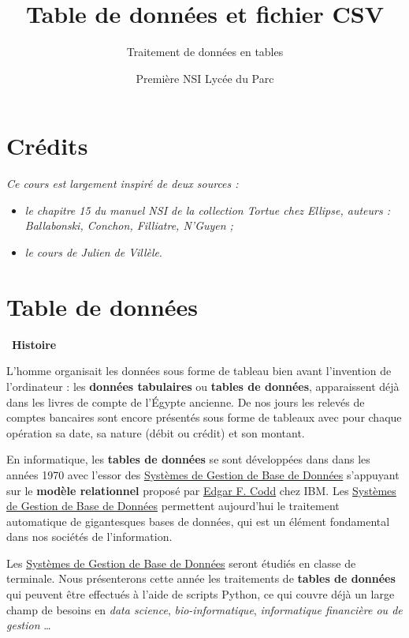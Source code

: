 \documentclass[
  11pt,
]{article}
\title{Table de données et fichier CSV}
\subtitle{Traitement de données en tables}
\author{Première NSI Lycée du Parc}
\date{}
\providecommand{\tightlist}{%
  \setlength{\itemsep}{0pt}\setlength{\parskip}{0pt}}
\newcounter{prop}
\newcounter{cours}
\newcounter{histo}
\newenvironment{histoire}[1]
{\par \medskip   \addtocounter{histo}{1} \noindent  
 \begin {bclogo}[couleur = blue!10 , arrondi =0.1,logo=\bchorloge, marge=4] {~\textbf{Histoire} \textbf{\thehisto} {\itshape #1} }  \par}
{
\end{bclogo}
 \par \bigskip }
\begin{document}
\maketitle

\renewcommand*\contentsname{Table des matières}
{
\hypersetup{linkcolor=}
\setcounter{tocdepth}{3}
\tableofcontents
}
\hypertarget{cruxe9dits}{%
\section*{Crédits}\label{cruxe9dits}}

\emph{Ce cours est largement inspiré de deux sources :}

\begin{itemize}
\tightlist
\item
  \emph{le chapitre 15 du manuel NSI de la collection Tortue chez
  Ellipse, auteurs : Ballabonski, Conchon, Filliatre, N'Guyen ;}
\item
  \emph{le cours de Julien de Villèle}.
\end{itemize}

\hypertarget{table-de-donnuxe9es}{%
\section{Table de données}\label{table-de-donnuxe9es}}

\begin{histoire}{}

L'homme organisait les données sous forme de tableau bien avant
l'invention de l'ordinateur : les \textbf{données tabulaires} ou
\textbf{tables de données}, apparaissent déjà dans les livres de compte
de l'Égypte ancienne. De nos jours les relevés de comptes bancaires sont
encore présentés sous forme de tableaux avec pour chaque opération sa
date, sa nature (débit ou crédit) et son montant.

En informatique, les \textbf{tables de données} se sont développées dans
dans les années 1970 avec l'essor des
\href{https://fr.wikipedia.org/wiki/Syst\%C3\%A8me_de_gestion_de_base_de_donn\%C3\%A9es}{Systèmes
de Gestion de Base de Données} s'appuyant sur le \textbf{modèle
relationnel} proposé par
\href{https://fr.wikipedia.org/wiki/Edgar_Frank_Codd}{Edgar F. Codd}
chez IBM. Les
\href{https://fr.wikipedia.org/wiki/Syst\%C3\%A8me_de_gestion_de_base_de_donn\%C3\%A9es}{Systèmes
de Gestion de Base de Données} permettent aujourd'hui le traitement
automatique de gigantesques bases de données, qui est un élément
fondamental dans nos sociétés de l'information.

Les
\href{https://fr.wikipedia.org/wiki/Syst\%C3\%A8me_de_gestion_de_base_de_donn\%C3\%A9es}{Systèmes
de Gestion de Base de Données} seront étudiés en classe de terminale.
Nous présenterons cette année les traitements de \textbf{tables de
données} qui peuvent être effectués à l'aide de scripts Python, ce qui
couvre déjà un large champ de besoins en \emph{data science},
\emph{bio-informatique}, \emph{informatique financière ou de gestion}
\ldots{}

\end{histoire}
\end{document}
